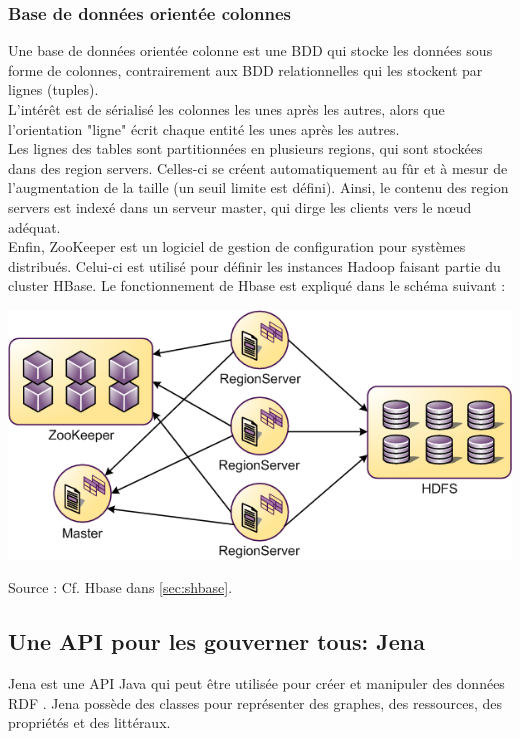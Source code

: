 \documentclass{article}
\begin{document}
\subsubsection{Base de données orientée colonnes}\label{sec:Hbase}
Une base de données orientée colonne est une BDD qui stocke les données sous forme de colonnes, contrairement aux BDD relationnelles qui les stockent par lignes (tuples). \\
L'intérêt est de sérialisé les colonnes les unes après les autres, alors que l'orientation "ligne" écrit chaque entité les unes après les autres.\\
Les lignes des tables sont partitionnées en plusieurs regions, qui sont stockées dans des region servers. Celles-ci se créent automatiquement au fûr et à mesur de l'augmentation de la taille (un seuil limite est défini). Ainsi, le contenu des region servers est indexé dans un serveur master, qui dirge les clients vers le nœud adéquat. \\
Enfin, ZooKeeper est un logiciel de gestion de configuration pour systèmes distribués. Celui-ci est utilisé pour définir les instances Hadoop faisant partie du cluster HBase. Le fonctionnement de Hbase est expliqué dans le schéma suivant : 
\begin{center}
\includegraphics[scale=0.5]{hbase-shema.png} 
\label{fig_hbase}
\end{center}
Source :  Cf. Hbase dans \ref{sec:shbase}.


 
\subsection{Une API pour les gouverner tous: Jena}\label{sec:Jena}

Jena est une API Java qui peut être utilisée pour créer et manipuler des données RDF . Jena possède des classes pour représenter des graphes, des ressources, des propriétés et des littéraux.
\end{document}
